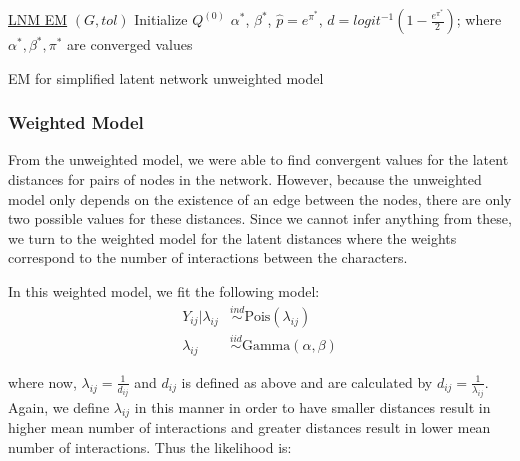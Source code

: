 \documentclass{article}
\begin{document}
\begin{algorithm*}\label{EM_alg_unweighted}
    \underline{LNM EM} $(G, tol)$\;
    Initialize $Q^{(0)}$
     \Return $\alpha^*$, $\beta^*$, $\hat{p} =  e^{\pi^*}$, $\hat{d} = logit^{-1}(1 - \frac{e^{\pi^*}}{2})$; where $\alpha^*, \beta^*, \pi^*$ are converged values \
    \caption{EM for simplified latent network unweighted model}
\end{algorithm*}

\subsubsection{Weighted Model}
From the unweighted model, we were able to find convergent values for the latent distances for pairs of nodes in the network. However, because the unweighted model only depends on the existence of an edge between the nodes, there are only two possible values for these distances. Since we cannot infer anything from these, we turn to the weighted model for the latent distances where the weights correspond to the number of interactions between the characters.  

In this weighted model, we fit the following model:
\begin{align*}
Y_{ij} | \lambda_{ij} &\overset{ind}\sim \text{Pois}(\lambda_{ij}) \\
\lambda_{ij} &\overset{iid}\sim \text{Gamma}(\alpha, \beta)
\end{align*}

where now, $\lambda_{ij} = \frac{1}{d_{ij}}$ and $d_{ij}$ is defined as above and are calculated by $d_{ij} = \frac{1}{\lambda_{ij}}$. Again, we define $\lambda_{ij}$ in this manner in order to have smaller distances result in higher mean number of interactions and greater distances result in lower mean number of interactions. Thus the likelihood is:
\end{document}
